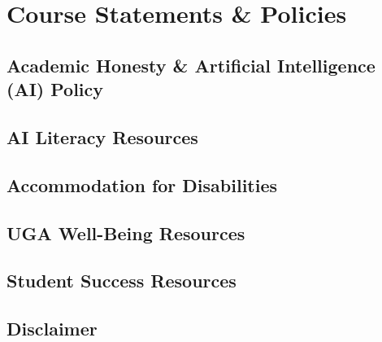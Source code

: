 \documentclass[11pt]{article}
\begin{document}
\section*{Course Statements \& Policies}

\subsection*{Academic Honesty \& Artificial Intelligence (AI) Policy}


\subsection*{AI Literacy Resources}


\subsection*{Accommodation for Disabilities}


\subsection*{UGA Well-Being Resources}


\subsection*{Student Success Resources}


\subsection*{Disclaimer}

\end{document}
